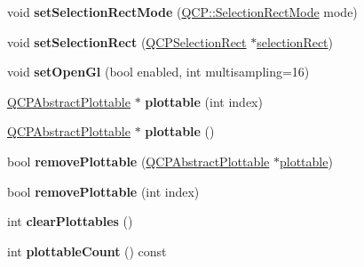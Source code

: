 \begin{DoxyCompactItemize}
\mbox{\label{class_q_custom_plot_a810ef958ebe84db661c7288b526c0deb}} 
void {\bfseries set\+Selection\+Rect\+Mode} (\hyperlink{namespace_q_c_p_ac9aa4d6d81ac76b094f9af9ad2d3aacf}{Q\+C\+P\+::\+Selection\+Rect\+Mode} mode)
\item 
\mbox{\label{class_q_custom_plot_a0c09f96df15faa4799ad7051bb16cf33}} 
void {\bfseries set\+Selection\+Rect} (\hyperlink{class_q_c_p_selection_rect}{Q\+C\+P\+Selection\+Rect} $\ast$\hyperlink{class_q_custom_plot_ad7df2bcbba307e644db383b449e31efd}{selection\+Rect})
\item 
\mbox{\label{class_q_custom_plot_a7db1adc09016329f3aef7c60da935789}} 
void {\bfseries set\+Open\+Gl} (bool enabled, int multisampling=16)
\item 
\mbox{\label{class_q_custom_plot_ad4eeafe213dadabff75db0432277f644}} 
\hyperlink{class_q_c_p_abstract_plottable}{Q\+C\+P\+Abstract\+Plottable} $\ast$ {\bfseries plottable} (int index)
\item 
\mbox{\label{class_q_custom_plot_ac47df4ac8bc180c8771083ecb599eaeb}} 
\hyperlink{class_q_c_p_abstract_plottable}{Q\+C\+P\+Abstract\+Plottable} $\ast$ {\bfseries plottable} ()
\item 
\mbox{\label{class_q_custom_plot_af3dafd56884208474f311d6226513ab2}} 
bool {\bfseries remove\+Plottable} (\hyperlink{class_q_c_p_abstract_plottable}{Q\+C\+P\+Abstract\+Plottable} $\ast$\hyperlink{class_q_custom_plot_a32de81ff53e263e785b83b52ecd99d6f}{plottable})
\item 
\mbox{\label{class_q_custom_plot_afc210e0021480f8119bccf37839dbcc8}} 
bool {\bfseries remove\+Plottable} (int index)
\item 
\mbox{\label{class_q_custom_plot_a9a409bb3201878adb7ffba1c89c4e004}} 
int {\bfseries clear\+Plottables} ()
\item 
\mbox{\label{class_q_custom_plot_a5f4f15991c14bf9ad659bb2a19dfbed4}} 
int {\bfseries plottable\+Count} () const
\item 

\end{DoxyCompactItemize}
